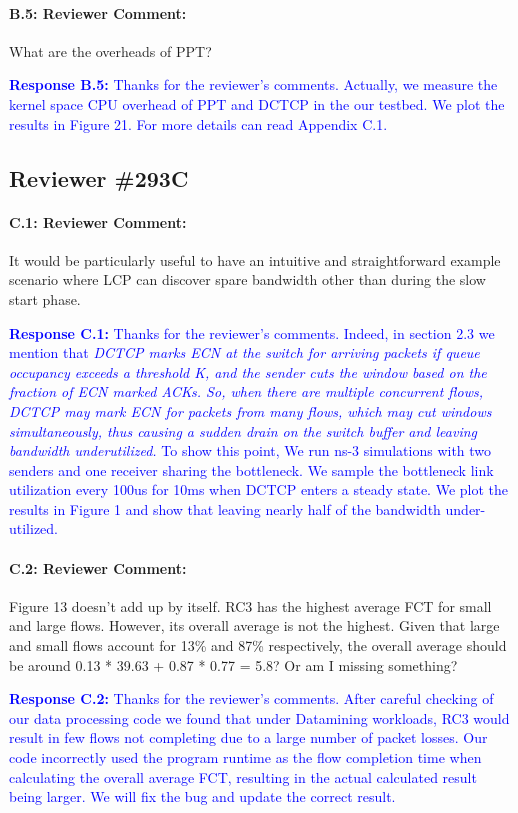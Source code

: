 \documentclass[12pt,one-column]{article}
\begin{document}
{\it \paragraph{B.5: Reviewer Comment:} What are the overheads of PPT?}

\noindent\textcolor{blue}{\textbf{Response B.5:}
Thanks for the reviewer’s comments. 
Actually, we measure the kernel space CPU overhead of PPT and DCTCP in the our testbed.
We plot the results in Figure 21.
For more details can read Appendix C.1.
}

\subsection{Reviewer \#293C}
{\it \paragraph{C.1: Reviewer Comment:} It would be particularly useful to have an intuitive and straightforward example scenario where LCP can discover spare bandwidth other than during the slow start phase.}

\noindent\textcolor{blue}{\textbf{Response C.1:}
Thanks for the reviewer’s comments. 
Indeed, in section 2.3 we mention that \emph{DCTCP marks ECN at the switch for arriving packets if queue occupancy exceeds a threshold K, and the sender cuts the window based on the fraction of ECN marked ACKs. So, when there are multiple concurrent flows, DCTCP may mark ECN for packets from many flows, which may cut windows simultaneously, thus causing a sudden drain on the switch buffer and leaving bandwidth underutilized.}
To show this point, We run ns-3 simulations with two senders and one receiver sharing the bottleneck. 
We sample the bottleneck link utilization every 100us for 10ms when DCTCP enters a steady state.
We plot the results in Figure 1 and show that  leaving nearly half of the bandwidth under-utilized.
}

{\it \paragraph{C.2: Reviewer Comment:} Figure 13 doesn’t add up by itself. RC3 has the highest average FCT for small and large flows. However, its overall average is not the highest. Given that large and small flows account for 13\% and 87\% respectively, the overall average should be around 0.13 * 39.63 + 0.87 * 0.77 = 5.8? Or am I missing something?}


\noindent\textcolor{blue}{\textbf{Response C.2:}
	Thanks for the reviewer’s comments. 
	After careful checking of our data processing code we found that under Datamining workloads, RC3 would result in few flows not completing due to a large number of packet losses.
	Our code incorrectly used the program runtime as the flow completion time when calculating the overall average FCT, resulting in the actual calculated result being larger.
	We will fix the bug and update the correct result.
}
\end{document}

